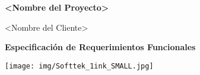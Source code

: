 \begin{titlepage}
    \begin{center}
        \vspace*{1cm}
        
        \Huge
        \textbf{<Nombre del Proyecto>}
        
        \vspace{0.5cm}
        \LARGE
        <Nombre del Cliente>
        
        \vspace{3cm}
        
        \textbf{Especificaci\'on de Requerimientos Funcionales}
        
        \vfill
        
        \vspace{0.8cm}
        
        \texttt{[image: img/Softtek\_1ink\_SMALL.jpg]}
        
        \Large
        
    \end{center}
\end{titlepage}
